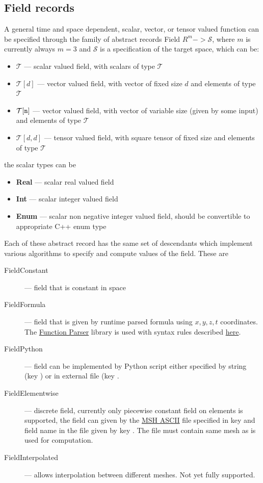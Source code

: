 \subsection{Field records}
\label{}
A general time and space dependent, scalar, vector, or  tensor valued function can be specified through the family of abstract records 
Field $R^m -> \mathcal{S}$, where $m$ is currently always $m=3$ and $\mathcal{S}$ is a specification of the target space, which can be:
\begin{itemize}
 \item {\bf $\mathcal{T}$} --- scalar valued field, with scalars of type $\mathcal{T}$
 \item {\bf $\mathcal{T}[d]$} --- vector valued field, with vector of fixed size $d$ and elements of type $\mathcal{T}$
 \item {\bf $\mathcal{T}[\tt n]$} --- vector valued field, with vector of variable size (given by some input) and elements of type $\mathcal{T}$
 \item {\bf $\mathcal{T}[d, d]$} --- tensor valued field, with square tensor of fixed size and elements of type $\mathcal{T}$
\end{itemize}
the scalar types can be
\begin{itemize}
 \item {\bf Real} --- scalar real valued field
 \item {\bf Int}  --- scalar integer valued field
 \item {\bf Enum} --- scalar non negative integer valued field, should be convertible to appropriate C++ enum type
\end{itemize}

Each of these abstract record has the same set of descendants which implement various algorithms to specify and compute values of the field. These are
\begin{description}
 \item[FieldConstant] --- field that is constant in space
 \item[FieldFormula] --- field that is given by runtime parsed formula using $x,y,z,t$ coordinates. The \href{http://warp.povusers.org/FunctionParser/}{Function Parser} library is used
 with syntax rules described \href{http://warp.povusers.org/FunctionParser/fparser.html#literals}{here}.
 \item[FieldPython] --- field can be implemented by Python script either specified by string (key ) 
 or in external file (key . 
 \item[FieldElementwise] --- discrete field, currently only piecewise constant field on elements is supported, the field can given by 
 the \href{http://geuz.org/gmsh/doc/texinfo/gmsh.html#MSH-ASCII-file-format}{MSH ASCII} file specified in key  and field name in the file given 
 by key . The file must contain same mesh as is used for computation.
 \item[FieldInterpolated] --- allows interpolation between different meshes. Not yet fully supported.
\end{description}

